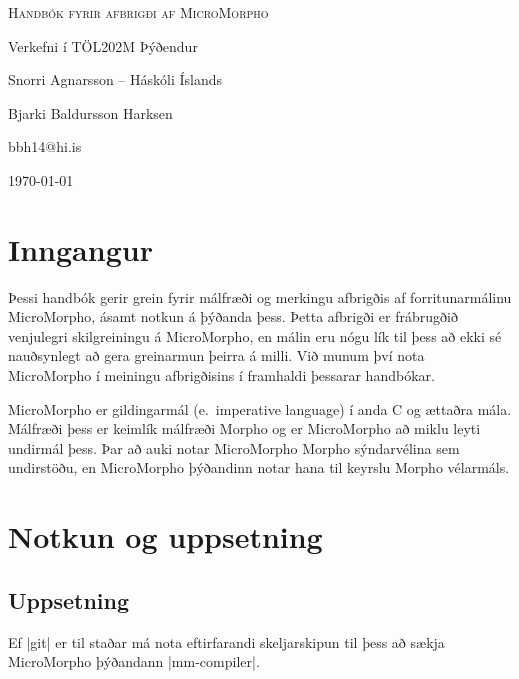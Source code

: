 \documentclass[12pt]{article}
\begin{document}
\shortverb{\|}

\begin{titlepage}
    \centering
    \vspace*{4cm}
    {\huge\scshape Handbók fyrir afbrigði af MicroMorpho}\par
    \vspace{0.5cm}
    {\Large Verkefni í TÖL202M Þýðendur}\par
    {\large Snorri Agnarsson – Háskóli Íslands}\par
    \vspace{5cm}
    {\large Bjarki Baldursson Harksen\par}
    \vspace{0.2cm}
    {\large\ttfamily bbh14@hi.is}\par
    \vfill
    \today
\end{titlepage}


\tableofcontents


\section{Inngangur}
Þessi handbók gerir grein fyrir málfræði og merkingu
afbrigðis af forritunarmálinu MicroMorpho, ásamt notkun
á þýðanda þess.
Þetta afbrigði er frábrugðið venjulegri skilgreiningu
á MicroMorpho, en málin eru nógu lík til þess að ekki sé nauðsynlegt
að gera greinarmun þeirra á milli. Við munum því nota MicroMorpho
í meiningu afbrigðisins í framhaldi þessarar handbókar.

MicroMorpho er gildingarmál (e.~imperative language) í anda C og ættaðra mála.
Málfræði þess er keimlík málfræði Morpho og er MicroMorpho að miklu leyti undirmál þess.
Þar að auki notar MicroMorpho Morpho sýndarvélina sem undirstöðu, en
MicroMorpho þýðandinn notar hana til keyrslu Morpho vélarmáls.

\section{Notkun og uppsetning}

\subsection{Uppsetning}
Ef |git| er til staðar má nota eftirfarandi skeljarskipun
til þess að sækja MicroMorpho þýðandann |mm-compiler|.
\end{document}
